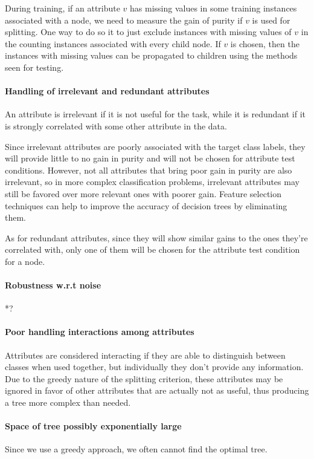During training, if an attribute $v$ has missing values in some training instances associated with a node, we need to measure the gain of purity if $v$ is used for splitting. One way to do so it to just exclude instances with missing values of $v$ in the counting instances associated with every child node. If $v$ is chosen, then the instances with missing values can be propagated to children using the methods seen for testing.

\paragraph{Handling of irrelevant and redundant attributes}
An attribute is irrelevant if it is not useful for the task, while it is redundant if it is strongly correlated with some other attribute in the data.
    
Since irrelevant attributes are poorly associated with the target class labels, they will provide little to no gain in purity and will not be chosen for attribute test conditions. However, not all attributes that bring poor gain in purity are also irrelevant, so in more complex classification problems, irrelevant attributes may still be favored over more relevant ones with poorer gain. Feature selection techniques can help to improve the accuracy of decision trees by eliminating them.

As for redundant attributes, since they will show similar gains to the ones they're correlated with, only one of them will be chosen for the attribute test condition for a node.

\paragraph{Robustness w.r.t noise}
*?

\paragraph{Poor handling interactions among attributes}
Attributes are considered interacting if they are able to distinguish between classes when used together, but individually they don't provide any information. Due to the greedy nature of the splitting criterion, these attributes may be ignored in favor of other attributes that are actually not as useful, thus producing a tree more complex than needed.

\paragraph{Space of tree possibly exponentially large}
Since we use a greedy approach, we often cannot find the optimal tree.

